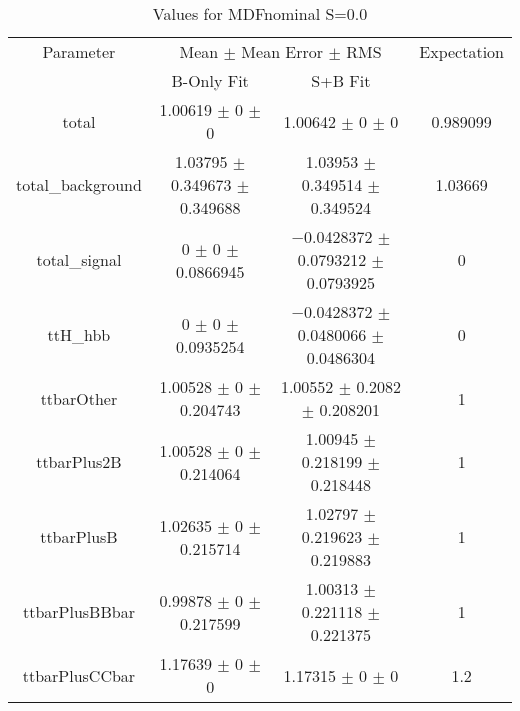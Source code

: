 \begin{table}
\centering
\caption{Values for MDFnominal S=0.0}
\begin{tabular}{cccc}
\toprule
Parameter & \multicolumn{2}{c}{Mean $\pm$ Mean Error $\pm$ RMS} & Expectation\\
 & B-Only Fit & S+B Fit & \\
\midrule
total & \num{1.00619} $\pm$ \num{0} $\pm$ \num{0} & \num{1.00642} $\pm$ \num{0} $\pm$ \num{0} & \num{0.989099}\\
total\_background & \num{1.03795} $\pm$ \num{0.349673} $\pm$ \num{0.349688} & \num{1.03953} $\pm$ \num{0.349514} $\pm$ \num{0.349524} & \num{1.03669}\\
total\_signal & \num{0} $\pm$ \num{0} $\pm$ \num{0.0866945} & \num{-0.0428372} $\pm$ \num{0.0793212} $\pm$ \num{0.0793925} & \num{0}\\
ttH\_hbb & \num{0} $\pm$ \num{0} $\pm$ \num{0.0935254} & \num{-0.0428372} $\pm$ \num{0.0480066} $\pm$ \num{0.0486304} & \num{0}\\
ttbarOther & \num{1.00528} $\pm$ \num{0} $\pm$ \num{0.204743} & \num{1.00552} $\pm$ \num{0.2082} $\pm$ \num{0.208201} & \num{1}\\
ttbarPlus2B & \num{1.00528} $\pm$ \num{0} $\pm$ \num{0.214064} & \num{1.00945} $\pm$ \num{0.218199} $\pm$ \num{0.218448} & \num{1}\\
ttbarPlusB & \num{1.02635} $\pm$ \num{0} $\pm$ \num{0.215714} & \num{1.02797} $\pm$ \num{0.219623} $\pm$ \num{0.219883} & \num{1}\\
ttbarPlusBBbar & \num{0.99878} $\pm$ \num{0} $\pm$ \num{0.217599} & \num{1.00313} $\pm$ \num{0.221118} $\pm$ \num{0.221375} & \num{1}\\
ttbarPlusCCbar & \num{1.17639} $\pm$ \num{0} $\pm$ \num{0} & \num{1.17315} $\pm$ \num{0} $\pm$ \num{0} & \num{1.2}\\
\bottomrule
\end{tabular}
\end{table}